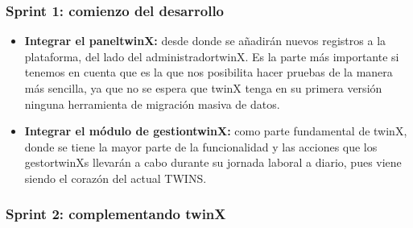 \subsubsection*{\textbf{Sprint 1: comienzo del desarrollo}}

\begin{itemize}
	\item \textbf{Integrar el \gls{paneltwinX}:} desde donde se añadirán nuevos registros a la plataforma, del lado del \gls{administradortwinX}. Es la parte más importante si tenemos en cuenta que es la que nos posibilita hacer pruebas de la manera más sencilla, ya que no se espera que twinX tenga en su primera versión ninguna herramienta de migración masiva de datos. 

	\item \textbf{Integrar el módulo de \gls{gestiontwinX}:} como parte fundamental de twinX, donde se tiene la mayor parte de la funcionalidad y las acciones que los \glspl{gestortwinX} llevarán a cabo durante su jornada laboral a diario, pues viene siendo el corazón del actual TWINS.
	
\end{itemize}

\subsubsection*{\textbf{Sprint 2: complementando twinX}}
\label{subsubsec:segundosprint}

